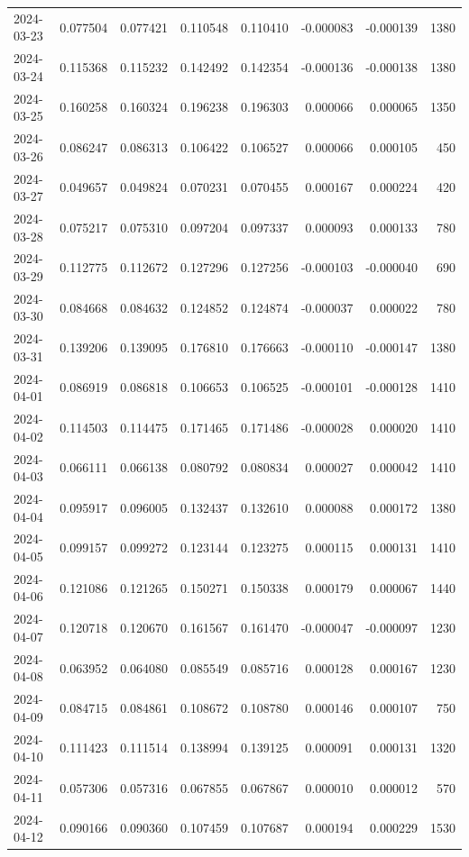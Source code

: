 \begin{tabular}{lrrrrrrr}
2024-03-23 & 0.077504 & 0.077421 & 0.110548 & 0.110410 & -0.000083 & -0.000139 & 1380 \\
2024-03-24 & 0.115368 & 0.115232 & 0.142492 & 0.142354 & -0.000136 & -0.000138 & 1380 \\
2024-03-25 & 0.160258 & 0.160324 & 0.196238 & 0.196303 & 0.000066 & 0.000065 & 1350 \\
2024-03-26 & 0.086247 & 0.086313 & 0.106422 & 0.106527 & 0.000066 & 0.000105 & 450 \\
2024-03-27 & 0.049657 & 0.049824 & 0.070231 & 0.070455 & 0.000167 & 0.000224 & 420 \\
2024-03-28 & 0.075217 & 0.075310 & 0.097204 & 0.097337 & 0.000093 & 0.000133 & 780 \\
2024-03-29 & 0.112775 & 0.112672 & 0.127296 & 0.127256 & -0.000103 & -0.000040 & 690 \\
2024-03-30 & 0.084668 & 0.084632 & 0.124852 & 0.124874 & -0.000037 & 0.000022 & 780 \\
2024-03-31 & 0.139206 & 0.139095 & 0.176810 & 0.176663 & -0.000110 & -0.000147 & 1380 \\
2024-04-01 & 0.086919 & 0.086818 & 0.106653 & 0.106525 & -0.000101 & -0.000128 & 1410 \\
2024-04-02 & 0.114503 & 0.114475 & 0.171465 & 0.171486 & -0.000028 & 0.000020 & 1410 \\
2024-04-03 & 0.066111 & 0.066138 & 0.080792 & 0.080834 & 0.000027 & 0.000042 & 1410 \\
2024-04-04 & 0.095917 & 0.096005 & 0.132437 & 0.132610 & 0.000088 & 0.000172 & 1380 \\
2024-04-05 & 0.099157 & 0.099272 & 0.123144 & 0.123275 & 0.000115 & 0.000131 & 1410 \\
2024-04-06 & 0.121086 & 0.121265 & 0.150271 & 0.150338 & 0.000179 & 0.000067 & 1440 \\
2024-04-07 & 0.120718 & 0.120670 & 0.161567 & 0.161470 & -0.000047 & -0.000097 & 1230 \\
2024-04-08 & 0.063952 & 0.064080 & 0.085549 & 0.085716 & 0.000128 & 0.000167 & 1230 \\
2024-04-09 & 0.084715 & 0.084861 & 0.108672 & 0.108780 & 0.000146 & 0.000107 & 750 \\
2024-04-10 & 0.111423 & 0.111514 & 0.138994 & 0.139125 & 0.000091 & 0.000131 & 1320 \\
2024-04-11 & 0.057306 & 0.057316 & 0.067855 & 0.067867 & 0.000010 & 0.000012 & 570 \\
2024-04-12 & 0.090166 & 0.090360 & 0.107459 & 0.107687 & 0.000194 & 0.000229 & 1530 \\

\end{tabular}
